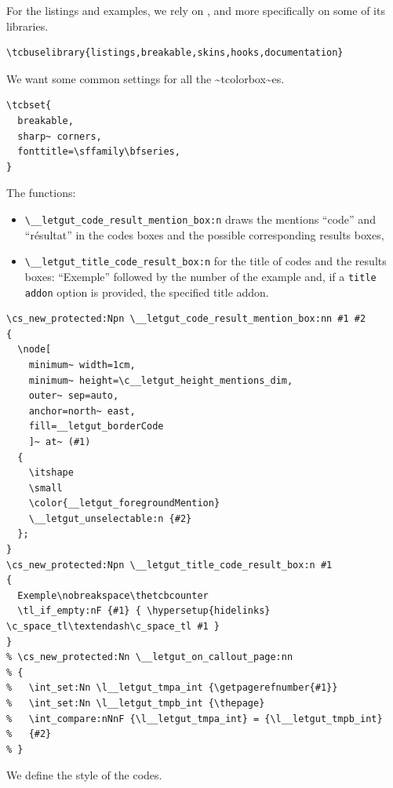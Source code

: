 \documentclass{letgut}
\begin{document}
For the listings and examples, we rely on , and more
specifically on some of its libraries.

\begin{lstlisting}
\tcbuselibrary{listings,breakable,skins,hooks,documentation}
\end{lstlisting}

We want some common settings for all the \textasciitilde{}tcolorbox\textasciitilde{}es.

\begin{lstlisting}
\tcbset{
  breakable,
  sharp~ corners,
  fonttitle=\sffamily\bfseries,
}
\end{lstlisting}

The functions:

\begin{itemize}
\item \lstinline+\__letgut_code_result_mention_box:n+ draws the mentions “code” and “résultat”
in the codes boxes and the possible corresponding results boxes,
\item \lstinline+\__letgut_title_code_result_box:n+ for the title of codes and the results
boxes: “Exemple” followed by the number of the example and, if a \lstinline+title addon+
option is provided, the specified title addon.
\end{itemize}

\begin{lstlisting}
\cs_new_protected:Npn \__letgut_code_result_mention_box:nn #1 #2
{
  \node[
    minimum~ width=1cm,
    minimum~ height=\c__letgut_height_mentions_dim,
    outer~ sep=auto,
    anchor=north~ east,
    fill=__letgut_borderCode
    ]~ at~ (#1)
  {
    \itshape
    \small
    \color{__letgut_foregroundMention}
    \__letgut_unselectable:n {#2}
  };
}
\cs_new_protected:Npn \__letgut_title_code_result_box:n #1
{
  Exemple\nobreakspace\thetcbcounter
  \tl_if_empty:nF {#1} { \hypersetup{hidelinks} \c_space_tl\textendash\c_space_tl #1 }
}
% \cs_new_protected:Nn \__letgut_on_callout_page:nn
% {
%   \int_set:Nn \l__letgut_tmpa_int {\getpagerefnumber{#1}}
%   \int_set:Nn \l__letgut_tmpb_int {\thepage}
%   \int_compare:nNnF {\l__letgut_tmpa_int} = {\l__letgut_tmpb_int}
%   {#2}
% }
\end{lstlisting}

We define the style of the codes.
\end{document}
